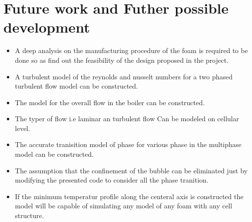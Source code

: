 \documentclass[compileTAMUreport.tex]{subfiles}
\begin{document}
\chapter{Future work and Futher possible development}
\begin{itemize}
\item A deep analysis on the manufacturing procedure of the foam is required to be done so as find out the feasibility of the design proposed in the project. 

\item A turbulent model of the reynolds and nusselt numbers for a two phased turbulent flow model can be constructed.

\item The model for the overall flow in the boiler can be constructed.

\item The typer of flow i.e laminar an turbulent flow Can be modeled on cellular level. 

\item The accurate tranisition model of phase for various phase in the multiphase model can be constructed.

\item The assumption that the confinement of the bubble can be eliminated just by modifying the presented code to consider all the phase tranition.

\item If the minimum temperatur profile along the centeral axis is constructed the model will be capable of simulating any model of any foam with any cell structure. 

\end{itemize}
\end{document}

